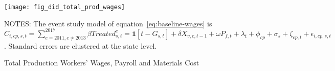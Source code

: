 \begin{figure}[H]
    \centering
    \texttt{[image: fig\_did\_total\_prod\_wages]}
    \caption{Total Production Workers' Wages, Payroll and Materials Cost}
    \label{fig:baseline-total-production-worker-wages}
    \begin{minipage}{12cm}
        \vspace{0.05in}
        NOTES: The event study model of equation~\ref{eq:baseline-wages} is $C_{i,cp,s,t} = \sum_{{e = 2011},{e \neq 2013}}^{2017} \beta Treated_{s,t}^e = \textbf{1}[t - G_{s,t}] + \delta X_{v,c,t-1} + \omega P_{f,t} + \lambda_{t} + \phi_{cp} + \sigma_{s} + \zeta_{cp,t} + \epsilon_{i,cp,s,t}$. Standard errors are clustered at the state level.
    \end{minipage}
\end{figure}